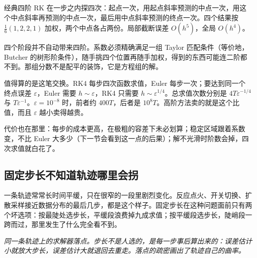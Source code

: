 经典四阶 RK 在一步之内探四次：起点一次，用起点斜率预测的中点一次，用这个中点斜率再预测的中点一次，最后用中点斜率预测的终点一次。四个结果按 \(\frac16(1,2,2,1)\) 加权，两个中点各占两份。局部截断误差 \(O(h^5)\)，全局 \(O(h^4)\)。

四个阶段并不自动带来四阶。系数必须精确满足一组 Taylor 匹配条件（等价地，Butcher 的树形阶条件），随手挑四个位置再随手加权，得到的东西可能连二阶都不到。那组分数不是配平的装饰，它是方程组的解。

值得算的是这笔交换。RK4 每步四次函数求值，Euler 每步一次；要达到同一个终点误差 \(\varepsilon\)，Euler 需要 \(h\sim\varepsilon\)，RK4 只需要 \(h\sim\varepsilon^{1/4}\)。总求值次数分别是 \(4T\varepsilon^{-1/4}\) 与 \(T\varepsilon^{-1}\)。\(\varepsilon=10^{-8}\) 时，前者约 \(400T\)，后者是 \(10^{8}T\)。高阶方法卖的就是这个比值，而且 \(\varepsilon\) 越小卖得越贵。

代价也在那里：每步的成本更高，在极粗的容差下未必划算；稳定区域跟着系数变，不比 Euler 大多少（下一节会看到这一点的后果）；解不光滑时阶数会掉，四次求值就白花了。

\subsection{固定步长不知道轨迹哪里会拐}

一条轨迹常常长时间平缓，只在很窄的一段里剧烈变化。反应点火、开关切换、扩散采样接近数据分布的最后几步，都是这个样子。固定步长在这种问题面前只有两个坏选项：按最陡处选步长，平缓段浪费掉九成求值；按平缓段选步长，陡峭段一跨而过，那里发生了什么完全看不到。

\begin{center}

\emph{同一条轨迹上的求解器落点。步长不是人选的，是每一步事后算出来的：误差估计小就放大步长，误差估计大就退回去重走。落点的疏密画出了轨迹自己的曲率。}
\end{center}

